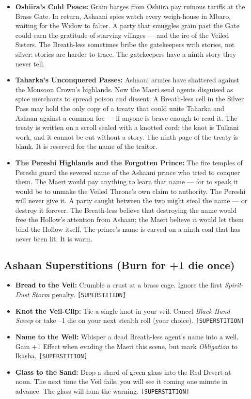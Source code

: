 \begin{itemize}
  \item \textbf{Oshiira's Cold Peace:} Grain barges from Oshiira pay ruinous tariffs at the Brass Gate. In return, Ashaani spies watch every weigh-house in Mbaro, waiting for the Widow to falter. A party that smuggles grain past the Gate could earn the gratitude of starving villages --- and the ire of the Veiled Sisters. The Breath-less sometimes bribe the gatekeepers with stories, not silver; stories are harder to trace. The gatekeepers have a ninth story they never tell.
  
  \item \textbf{Taharka's Unconquered Passes:} Ashaani armies have shattered against the Monsoon Crown's highlands. Now the Maeri send agents disguised as spice merchants to spread poison and dissent. A Breath-less cell in the Silver Pass may hold the only copy of a treaty that could unite Taharka and Ashaan against a common foe --- if anyone is brave enough to read it. The treaty is written on a scroll sealed with a knotted cord; the knot is Tulkani work, and it cannot be cut without a story. The ninth page of the treaty is blank. It is reserved for the name of the traitor.
  
  \item \textbf{The Pereshi Highlands and the Forgotten Prince:} The fire temples of Pereshi guard the severed name of the Ashaani prince who tried to conquer them. The Maeri would pay anything to learn that name --- for to speak it would be to unmake the Veiled Throne's own claim to authority. The Pereshi will never give it. A party caught between the two might steal the name --- or destroy it forever. The Breath-less believe that destroying the name would free the Hollow's attention from Ashaan; the Maeri believe it would let them bind the Hollow itself. The prince's name is carved on a ninth coal that has never been lit. It is warm.
\end{itemize}

\subsection*{Ashaan Superstitions (Burn for +1 die once)}
\begin{itemize}
  \item \textbf{Bread to the Veil:} Crumble a crust at a brass cage. Ignore the first \emph{Spirit-Dust Storm} penalty. \texttt{[SUPERSTITION]}
  \item \textbf{Knot the Veil-Clip:} Tie a single knot in your veil. Cancel \emph{Black Hand Sweep} or take --1 die on your next stealth roll (your choice). \texttt{[SUPERSTITION]}
  \item \textbf{Name to the Well:} Whisper a dead Breath-less agent's name into a well. Gain +1 Effect when evading the Maeri this scene, but mark \emph{Obligation} to Ikasha. \texttt{[SUPERSTITION]}
  \item \textbf{Glass to the Sand:} Drop a shard of green glass into the Red Desert at noon. The next time the Veil fails, you will see it coming one minute in advance. The glass will hum the warning. \texttt{[SUPERSTITION]}
\end{itemize}

